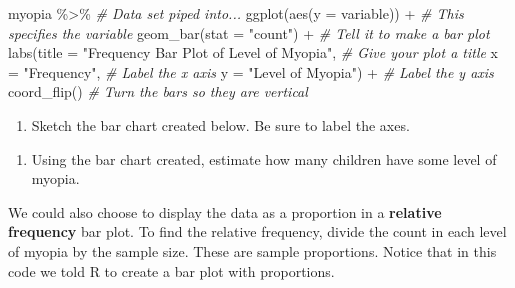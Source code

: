\documentclass[
]{report}
\newenvironment{Shaded}{\begin{snugshade}}{\end{snugshade}}
\newcommand{\AttributeTok}[1]{\textcolor[rgb]{0.77,0.63,0.00}{#1}}
\newcommand{\CommentTok}[1]{\textcolor[rgb]{0.56,0.35,0.01}{\textit{#1}}}
\newcommand{\FunctionTok}[1]{\textcolor[rgb]{0.00,0.00,0.00}{#1}}
\newcommand{\NormalTok}[1]{#1}
\newcommand{\SpecialCharTok}[1]{\textcolor[rgb]{0.00,0.00,0.00}{#1}}
\newcommand{\StringTok}[1]{\textcolor[rgb]{0.31,0.60,0.02}{#1}}
\providecommand{\tightlist}{%
  \setlength{\itemsep}{0pt}\setlength{\parskip}{0pt}}
\begin{document}
\begin{Shaded}
\begin{Highlighting}[]
\NormalTok{myopia }\SpecialCharTok{\%\textgreater{}\%} \CommentTok{\# Data set piped into...}
\FunctionTok{ggplot}\NormalTok{(}\FunctionTok{aes}\NormalTok{(}\AttributeTok{y =}\NormalTok{ variable)) }\SpecialCharTok{+}   \CommentTok{\# This specifies the variable}
  \FunctionTok{geom\_bar}\NormalTok{(}\AttributeTok{stat =} \StringTok{"count"}\NormalTok{) }\SpecialCharTok{+}  \CommentTok{\# Tell it to make a bar plot}
  \FunctionTok{labs}\NormalTok{(}\AttributeTok{title =} \StringTok{"Frequency Bar Plot of Level of Myopia"}\NormalTok{,  }\CommentTok{\# Give your plot a title}
       \AttributeTok{x =} \StringTok{"Frequency"}\NormalTok{,   }\CommentTok{\# Label the x axis}
       \AttributeTok{y =} \StringTok{"Level of Myopia"}\NormalTok{)  }\SpecialCharTok{+} \CommentTok{\# Label the y axis}
  \FunctionTok{coord\_flip}\NormalTok{()  }\CommentTok{\# Turn the bars so they are vertical}
\end{Highlighting}
\end{Shaded}

\begin{enumerate}
\def\labelenumi{\arabic{enumi}.}
\setcounter{enumi}{2}
\tightlist
\item
  Sketch the bar chart created below. Be sure to label the axes.
\end{enumerate}

\vspace{2in}

\begin{enumerate}
\def\labelenumi{\arabic{enumi}.}
\setcounter{enumi}{3}
\tightlist
\item
  Using the bar chart created, estimate how many children have some level of myopia.
\end{enumerate}

\vspace{0.2in}

We could also choose to display the data as a proportion in a \textbf{relative frequency} bar plot. To find the relative frequency, divide the count in each level of myopia by the sample size. These are sample proportions. Notice that in this code we told R to create a bar plot with proportions.
\end{document}
